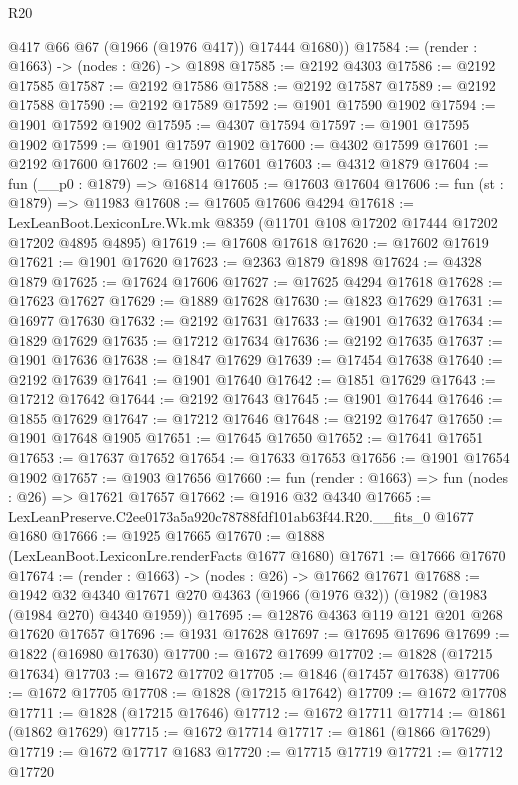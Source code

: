 \begin{lexlean}{R20}
\begin{coremodule}
        @417
        @66
        @67
        (@1966 (@1976 @417))
        @17444
        @1680))
@17584 := (render : @1663) -> (nodes : @26) -> @1898
@17585 := @2192 @4303
@17586 := @2192 @17585
@17587 := @2192 @17586
@17588 := @2192 @17587
@17589 := @2192 @17588
@17590 := @2192 @17589
@17592 := @1901 @17590 @1902
@17594 := @1901 @17592 @1902
@17595 := @4307 @17594
@17597 := @1901 @17595 @1902
@17599 := @1901 @17597 @1902
@17600 := @4302 @17599
@17601 := @2192 @17600
@17602 := @1901 @17601
@17603 := @4312 @1879
@17604 := fun (__p0 : @1879) => @16814
@17605 := @17603 @17604
@17606 := fun (st : @1879) => @11983
@17608 := @17605 @17606 @4294
@17618 := LexLeanBoot.LexiconLre.Wk.mk @8359 (@11701 @108 @17202 @17444 @17202 @17202 @4895 @4895)
@17619 := @17608 @17618
@17620 := @17602 @17619
@17621 := @1901 @17620
@17623 := @2363 @1879 @1898
@17624 := @4328 @1879
@17625 := @17624 @17606
@17627 := @17625 @4294 @17618
@17628 := @17623 @17627
@17629 := @1889 @17628
@17630 := @1823 @17629
@17631 := @16977 @17630
@17632 := @2192 @17631
@17633 := @1901 @17632
@17634 := @1829 @17629
@17635 := @17212 @17634
@17636 := @2192 @17635
@17637 := @1901 @17636
@17638 := @1847 @17629
@17639 := @17454 @17638
@17640 := @2192 @17639
@17641 := @1901 @17640
@17642 := @1851 @17629
@17643 := @17212 @17642
@17644 := @2192 @17643
@17645 := @1901 @17644
@17646 := @1855 @17629
@17647 := @17212 @17646
@17648 := @2192 @17647
@17650 := @1901 @17648 @1905
@17651 := @17645 @17650
@17652 := @17641 @17651
@17653 := @17637 @17652
@17654 := @17633 @17653
@17656 := @1901 @17654 @1902
@17657 := @1903 @17656
@17660 := fun (render : @1663) => fun (nodes : @26) => @17621 @17657
@17662 := @1916 @32 @4340
@17665 := LexLeanPreserve.C2ee0173a5a920c78788fdf101ab63f44.R20.__fits_0 @1677 @1680
@17666 := @1925 @17665
@17670 := @1888 (LexLeanBoot.LexiconLre.renderFacts @1677 @1680)
@17671 := @17666 @17670
@17674 := (render : @1663) -> (nodes : @26) -> @17662 @17671
@17688 := @1942
    @32
    @4340
    @17671
    @270
    @4363
    (@1966 (@1976 @32))
    (@1982 (@1983 (@1984 @270) @4340 @1959))
@17695 := @12876 @4363 @119 @121 @201 @268 @17620 @17657
@17696 := @1931 @17628
@17697 := @17695 @17696
@17699 := @1822 (@16980 @17630)
@17700 := @1672 @17699
@17702 := @1828 (@17215 @17634)
@17703 := @1672 @17702
@17705 := @1846 (@17457 @17638)
@17706 := @1672 @17705
@17708 := @1828 (@17215 @17642)
@17709 := @1672 @17708
@17711 := @1828 (@17215 @17646)
@17712 := @1672 @17711
@17714 := @1861 (@1862 @17629)
@17715 := @1672 @17714
@17717 := @1861 (@1866 @17629)
@17719 := @1672 @17717 @1683
@17720 := @17715 @17719
@17721 := @17712 @17720

\end{coremodule}
\end{lexlean}
